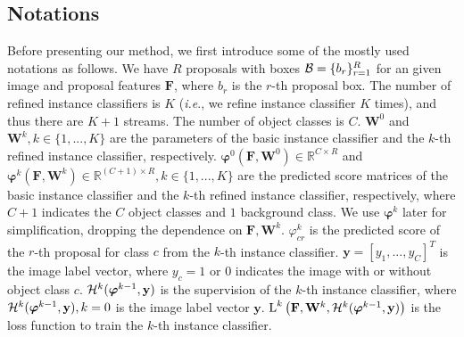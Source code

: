 \documentclass[10pt,journal,compsoc]{IEEEtran}
\def\ie{\emph{i.e}.} \def\Ie{\emph{I.e}.}
\begin{document}
\subsection{Notations}
\label{sec:notation}


Before presenting our method,
we first introduce some of the mostly used notations as follows.
We have $R$ proposals with boxes ${\cal B} = \{b_{r}\}_{r=1}^{R}$ for an given image
and proposal features $\mathbf{F}$,
where $b_{r}$ is the $r$-th proposal box.
The number of refined instance classifiers is $K$ (\ie, we refine instance classifier $K$ times), and thus there are $K+1$ streams.
The number of object classes is $C$.
$\mathbf{W}^{0}$ and $\mathbf{W}^{k}, k \in \{1, ..., K\}$ are the parameters of the basic instance classifier and the $k$-th refined instance classifier, respectively.
$\bm{\varphi}^{0}(\mathbf{F}, \mathbf{W}^{0}) \in \mathbb{R}^{C \times R}$ and $\bm{\varphi}^{k}(\mathbf{F}, \mathbf{W}^{k}) \in \mathbb{R}^{(C+1) \times R}, k \in \{1, ..., K\}$ are the predicted score matrices
of the basic instance classifier and the $k$-th refined instance classifier, respectively,
where $C+1$ indicates the $C$ object classes and $1$ background class.
We use $\bm{\varphi}^{k}$ later for simplification, dropping the dependence on $\mathbf{F}, \mathbf{W}^{k}$.
$\varphi^{k}_{cr}$ is the predicted score of the $r$-th proposal for class $c$ from the $k$-th instance classifier.
$\mathbf{y} = [y_{1}, ..., y_{C}]^{T}$ is the image label vector,
where $y_{c}=1$ or $0$ indicates the image with or without object class $c$.
${\cal H}^{k}(\bm{\varphi}^{k-1}, \mathbf{y})$ is the supervision of the $k$-th instance classifier,
where ${\cal H}^{k}(\bm{\varphi}^{k-1}, \mathbf{y}), k=0$ is the image label vector $\mathbf{y}$.
$\textup{L}^{k}\left( \mathbf{F}, \mathbf{W}^{k}, {\cal H}^{k}(\bm{\varphi}^{k-1}, \mathbf{y}) \right)$ is the loss function to train the $k$-th instance classifier.
\end{document}
